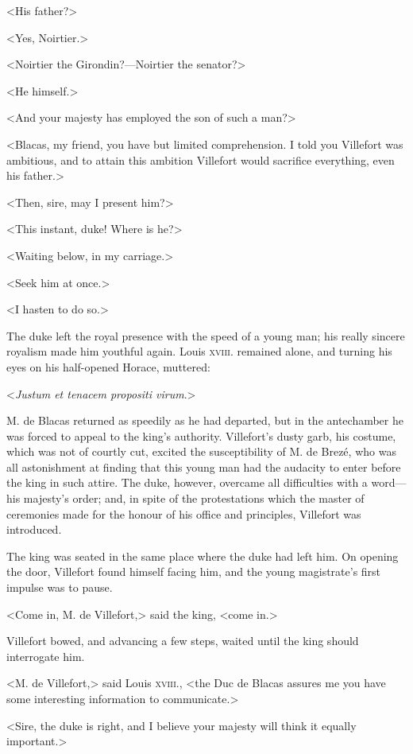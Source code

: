  <His father?> 

 <Yes, Noirtier.> 

 <Noirtier the Girondin?—Noirtier the senator?> 

 <He himself.> 

 <And your majesty has employed the son of such a man?> 

 <Blacas, my friend, you have but limited comprehension. I told you Villefort was ambitious, and to attain this ambition Villefort would sacrifice everything, even his father.> 

 <Then, sire, may I present him?> 

 <This instant, duke! Where is he?> 

 <Waiting below, in my carriage.> 

 <Seek him at once.> 

 <I hasten to do so.> 

 The duke left the royal presence with the speed of a young man; his really sincere royalism made him youthful again. Louis \textsc{xviii.} remained alone, and turning his eyes on his half-opened Horace, muttered: 

 <\textit{Justum et tenacem propositi virum}.> 

 M. de Blacas returned as speedily as he had departed, but in the antechamber he was forced to appeal to the king's authority. Villefort's dusty garb, his costume, which was not of courtly cut, excited the susceptibility of M. de Brezé, who was all astonishment at finding that this young man had the audacity to enter before the king in such attire. The duke, however, overcame all difficulties with a word—his majesty's order; and, in spite of the protestations which the master of ceremonies made for the honour of his office and principles, Villefort was introduced. 

 The king was seated in the same place where the duke had left him. On opening the door, Villefort found himself facing him, and the young magistrate's first impulse was to pause. 

 <Come in, M. de Villefort,> said the king, <come in.> 

 Villefort bowed, and advancing a few steps, waited until the king should interrogate him. 

 <M. de Villefort,> said Louis \textsc{xviii.}, <the Duc de Blacas assures me you have some interesting information to communicate.> 

 <Sire, the duke is right, and I believe your majesty will think it equally important.>

